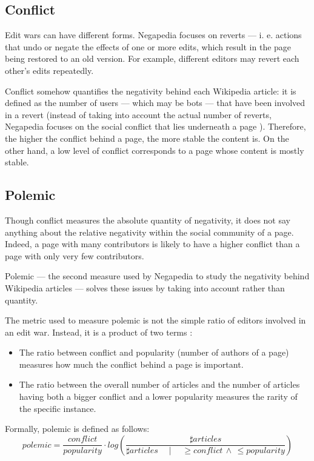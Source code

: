         \subsection{Conflict}
            Edit wars can have different forms. Negapedia focuses on reverts --- i. e. actions that undo or negate the effects of one or more edits, which result in the page being restored to an old version. For example, different editors may revert each other's edits repeatedly.
            
            Conflict somehow quantifies the negativity behind each Wikipedia article: it is defined as the number of users --- which may be bots --- that have been involved in a revert \cite{MarchioriBattle} (instead of taking into account the actual number of reverts, Negapedia focuses on the social conflict that lies underneath a page \cite{MarchioriNegapedia}). Therefore, the higher the conflict behind a page, the more stable the content is. On the other hand, a low level of conflict corresponds to a page whose content is mostly stable.
        \subsection{Polemic}
            Though conflict measures the absolute quantity of negativity, it does not say anything about the relative negativity within the social community of a page. Indeed, a page with many contributors is likely to have a higher conflict than a page with only very few contributors.
            
            Polemic --- the second measure used by Negapedia to study the negativity behind Wikipedia articles --- solves these issues by taking into account  rather than quantity.
            
            The metric used to measure polemic is not the simple ratio of editors involved in an edit war. Instead, it is a product of two terms \cite{MarchioriNegapedia}:
            \begin{itemize}
                \item The ratio between conflict and popularity (number of authors of a page) measures how much the conflict behind a page is important.
                \item The ratio between the overall number of articles and the number of articles having both a bigger conflict and a lower popularity measures the rarity of the specific instance.
            \end{itemize}
            Formally, polemic is defined as follows:
            \[polemic = \frac{conflict}{popularity} \cdot log\left(\frac{\sharp articles}{\sharp articles \quad \mid \quad \ge conflict\, \land\, \le popularity}\right)\]
